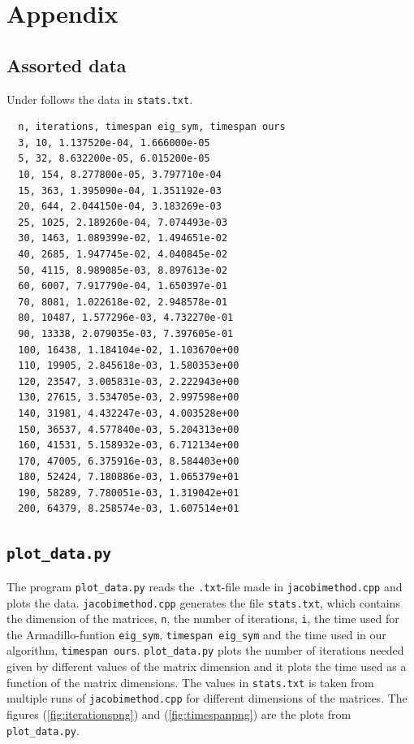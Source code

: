 \documentclass{article}
\begin{document}
\vspace{1cm}

\section{Appendix} \label{sec:Appendix}

\subsection{Assorted data}

Under follows the data in \texttt{stats.txt}.

\begin{verbatim}
  n, iterations, timespan eig_sym, timespan ours
  3, 10, 1.137520e-04, 1.666000e-05
  5, 32, 8.632200e-05, 6.015200e-05
  10, 154, 8.277800e-05, 3.797710e-04
  15, 363, 1.395090e-04, 1.351192e-03
  20, 644, 2.044150e-04, 3.183269e-03
  25, 1025, 2.189260e-04, 7.074493e-03
  30, 1463, 1.089399e-02, 1.494651e-02
  40, 2685, 1.947745e-02, 4.040845e-02
  50, 4115, 8.989085e-03, 8.897613e-02
  60, 6007, 7.917790e-04, 1.650397e-01
  70, 8081, 1.022618e-02, 2.948578e-01
  80, 10487, 1.577296e-03, 4.732270e-01
  90, 13338, 2.079035e-03, 7.397605e-01
  100, 16438, 1.184104e-02, 1.103670e+00
  110, 19905, 2.845618e-03, 1.580353e+00
  120, 23547, 3.005831e-03, 2.222943e+00
  130, 27615, 3.534705e-03, 2.997598e+00
  140, 31981, 4.432247e-03, 4.003528e+00
  150, 36537, 4.577840e-03, 5.204313e+00
  160, 41531, 5.158932e-03, 6.712134e+00
  170, 47005, 6.375916e-03, 8.584403e+00
  180, 52424, 7.180886e-03, 1.065379e+01
  190, 58289, 7.780051e-03, 1.319042e+01
  200, 64379, 8.258574e-03, 1.607514e+01
\end{verbatim}


\subsection{\texttt{plot\_data.py}}

The program \texttt{plot\_data.py} reads the \texttt{.txt}-file made in \texttt{jacobimethod.cpp} and plots the data. \texttt{jacobimethod.cpp} generates the file \texttt{stats.txt}, which contains the dimension of the matrices, \texttt{n}, the number of iterations, \texttt{i}, the time used for the Armadillo-funtion \texttt{eig\_sym}, \texttt{timespan eig\_sym} and the time used in our algorithm, \texttt{timespan ours}.
\texttt{plot\_data.py} plots the number of iterations needed given by different values of the matrix dimension and it plots the time used as a function of the matrix dimensions. The values in \texttt{stats.txt} is taken from multiple runs of \texttt{jacobimethod.cpp} for different dimensions of the matrices. The figures (\ref{fig:iterationspng}) and (\ref{fig:timespanpng}) are the plots from \texttt{plot\_data.py}.
\end{document}
